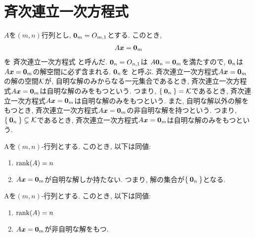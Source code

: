\section{斉次連立一次方程式}
$A$を$(m,n)$行列とし,
$\boldsymbol{0}_m=O_{m,1}$とする.
このとき,
\begin{align*}
  A\boldsymbol{x}=\boldsymbol{0}_m
\end{align*}
を
斉次連立一次方程式
と呼んだ.
$\boldsymbol{0}_n=O_{n,1}$は
$A\boldsymbol{0}_n=\boldsymbol{0}_m$を満たすので,
$\boldsymbol{0}_n$は$A\boldsymbol{x}=\boldsymbol{0}_m$の解空間に必ず含まれる.
$\boldsymbol{0}_n$を
%
%
%
%
%
%
%
%
%
と呼ぶ.
斉次連立一次方程式$A\boldsymbol{x}=\boldsymbol{0}_m$の解の空間$\mathcal{K}$が,
自明な解のみからなる一元集合であるとき,
斉次連立一次方程式$A\boldsymbol{x}=\boldsymbol{0}_m$は自明な解のみをもつという.
つまり,
$\Set{\boldsymbol{0}_n}=\mathcal{K}$であるとき,
斉次連立一次方程式$A\boldsymbol{x}=\boldsymbol{0}_m$は自明な解のみをもつという.
また,
自明な解以外の解をもつとき,
斉次連立一次方程式$A\boldsymbol{x}=\boldsymbol{0}_m$の非自明な解を持つという.
つまり,
$\Set{\boldsymbol{0}_n}\subsetneq\mathcal{K}$であるとき,
斉次連立一次方程式$A\boldsymbol{x}=\boldsymbol{0}_m$は自明な解のみをもつという.

\begin{prop}
  Aを$(m,n)$-行列とする.
  このとき, 以下は同値:
  \begin{enumerate}
  \item $\operatorname{rank}(A)=n$
  \item $A\boldsymbol{x}=\boldsymbol{0}_m$が自明な解しか持たない.
    つまり, 解の集合が$\Set{\boldsymbol{0}_n}$となる.
  \end{enumerate}
\end{prop}

\begin{prop}
  Aを$(m,n)$-行列とする.
  このとき, 以下は同値:
  \begin{enumerate}
  \item $\operatorname{rank}(A)=n$
  \item $A\boldsymbol{x}=\boldsymbol{0}_m$が非自明な解をもつ.
  \end{enumerate}
\end{prop}

